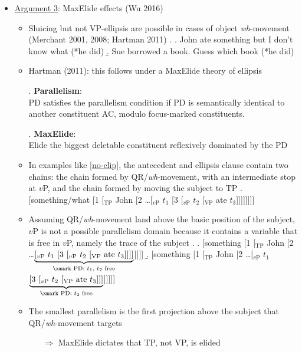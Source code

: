\documentclass[letterpaper,10pt]{handout_nick}
\begin{document}
\begin{itemize}
\item \underline{Argument 3}: MaxElide effects (Wu 2016)
\begin{itemize}
\item Sluicing but not VP-ellipsis are possible in cases of object \emph{wh}-movement (Merchant 2001, 2008; Hartman 2011)
\ex.\label{no-elip} \a. John ate something but I don't know what (*he did)
\b. Sue borrowed a book. Guess which book (*he did)

\item Hartman (2011): this follows under a MaxElide theory of ellipsis

\ex. {\bf Parallelism}:\\
PD satisfies the parallelism condition if PD is semantically identical to another constituent AC, modulo focus-marked constituents.

\ex. {\bf MaxElide}:\\
Elide the biggest deletable constituent reflexively dominated by the PD

\item In examples like \ref{no-elip}, the antecedent and ellipsis clause contain two chains: the chain formed by QR/\emph{wh}-movement, with an intermediate stop at $v$P, and the chain formed by moving the subject to TP 
\ex. [something/what [1 [$_\text{TP}$ John [2 \ldots [$_\text{$v$P}$ $t_1$ [3 [$_\text{$v$P}$ $t_2$ [$_\text{VP}$ ate $t_3$]]]]]]]]

\item Assuming QR/\emph{wh}-movement land above the basic position of the subject, $v$P is not a possible parallelism domain because it contains a variable that is free in $v$P, namely the trace of the subject 
\ex. \a. [something [1 [$_\text{TP}$ John [2 \ldots $\underbrace{\text{[$_\text{$v$P}$ $t_1$ [3 [$_\text{$v$P}$ $t_2$ [$_\text{VP}$ ate $t_3$]]]]}}_\text{\xmark\ PD: $t_1$, $t_2$ free}$]]]]
\b. [something [1 [$_\text{TP}$ John [2 \ldots [$_\text{$v$P}$ $t_1$ $\underbrace{\text{[3 [$_\text{$v$P}$ $t_2$ [$_\text{VP}$ ate $t_3$]]]}}_\text{\xmark\ PD: $t_2$ free}$]]]]]

\item The smallest parallelism is the first projection above the subject that QR/\emph{wh}-movement targets
\begin{itemize}
\item[$\Rightarrow$] MaxElide dictates that TP, not VP, is elided
\end{itemize}


\end{itemize}
\end{itemize}
\end{document}
